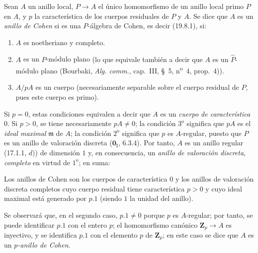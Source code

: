 
\begin{definition}[19.8.4]
\label{0.19.8.4-fr}
Sean $A$ un anillo local, $P\to A$ el único homomorfismo de un anillo local
primo $P$ en $A$, y $p$ la característica de los cuerpos residuales de $P$ y
$A$. Se dice que $A$ es un \emph{anillo de Cohen} si es una $P$-álgebra de
Cohen, es decir \textup{(19.8.1)}, si:
\begin{enumerate}
  \item[$1^{\mathrm o}$] $A$ es noetheriano y completo.
  \item[$2^{\mathrm o}$] $A$ es un $P$-módulo plano \textup{(lo que equivale también a
  decir que $A$ es un $\widehat P$-módulo plano (Bourbaki, \emph{Alg. comm.},
  cap.~III, §~5, n\textsuperscript{o}~4, prop.~4))}.
  \item[$3^{\mathrm o}$] $A/pA$ es un cuerpo \textup{(necesariamente separable sobre el
  cuerpo residual de $P$, pues este cuerpo es primo)}.
\end{enumerate}
\end{definition}

Si $p=0$, estas condiciones equivalen a decir que $A$ es un \emph{cuerpo de
característica $0$}. Si $p>0$, se tiene necesariamente $pA\neq0$; la condición
$3^{\mathrm o}$ significa que $pA$ es el \emph{ideal maximal} $\mathfrak m$ de $A$;
la condición $2^{\mathrm o}$ significa que $p$ es $A$-regular, puesto que $P$
es un anillo de valoración discreta ($\mathbf 0_{\mathrm I}$, 6.3.4). Por tanto,
$A$ es un anillo regular (17.1.1, $d)$) de dimensión $1$ y, en consecuencia, un
\emph{anillo de valoración discreta}, \emph{completo} en virtud de $1^{\mathrm o}$; en suma:

\begin{proposition}[19.8.5]
\label{0.19.8.5-fr}
Los anillos de Cohen son los cuerpos de característica $0$ y los anillos de
valoración discreta completos cuyo cuerpo residual tiene característica
$p>0$ y cuyo ideal maximal está generado por $p.1$ (siendo $1$ la unidad del
anillo).
\end{proposition}

Se observará que, en el segundo caso, $p.1\neq0$ porque $p$ es $A$-regular;
por tanto, se puede identificar $p.1$ con el entero $p$; el homomorfismo
canónico $\mathbf Z_p\to A$ es inyectivo, y se identifica $p.1$ con el
elemento $p$ de $\mathbf Z_p$; en este caso se dice que $A$ es un
\emph{$p$-anillo de Cohen}.


